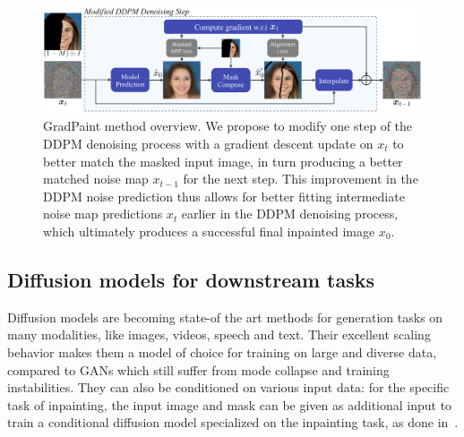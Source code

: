 \begin{figure}[h]
  \centering
    \includegraphics[width=\textwidth]{images/gradpaint/method.pdf}
    \caption{GradPaint method overview. We propose to modify one step of the DDPM denoising process with a gradient descent update on $x_t$ to better match the masked input image, in turn producing a better matched noise map $x_{t-1}$ for the next step. This improvement in the DDPM noise prediction thus allows for better fitting intermediate noise map predictions $x_t$ earlier in the DDPM denoising process, which ultimately produces a successful final inpainted image $x_0$.}
    \label{fig:method}
\end{figure}


\subsection{Diffusion models for downstream tasks}

Diffusion models are becoming state-of the art methods for generation tasks on many 
modalities, like images, videos, speech and text. Their excellent scaling behavior makes 
them a model of choice for training on large and diverse data, compared to GANs which 
still suffer from mode collapse and training instabilities. They can also be conditioned
 on various input data: for the specific task of inpainting, the input image and mask 
 can be given as additional input to train a conditional diffusion model specialized on
  the inpainting task, as done in~\cite{saharia2022palette}.

